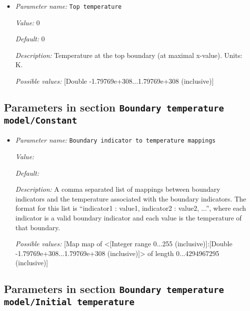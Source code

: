 \begin{itemize}
{\it Description:} Temperature at the right boundary (at maximal x-value). Units: K.


{\it Possible values:} [Double -1.79769e+308...1.79769e+308 (inclusive)]
\item {\it Parameter name:} {\tt Top temperature}


{\it Value:} 0


{\it Default:} 0


{\it Description:} Temperature at the top boundary (at maximal x-value). Units: K.


{\it Possible values:} [Double -1.79769e+308...1.79769e+308 (inclusive)]
\end{itemize}

\subsection{Parameters in section \tt Boundary temperature model/Constant}
\label{parameters:Boundary_20temperature_20model/Constant}

\begin{itemize}
\item {\it Parameter name:} {\tt Boundary indicator to temperature mappings}


{\it Value:} 


{\it Default:} 


{\it Description:} A comma separated list of mappings between boundary indicators and the temperature associated with the boundary indicators. The format for this list is ``indicator1 : value1, indicator2 : value2, ...'', where each indicator is a valid boundary indicator and each value is the temperature of that boundary.


{\it Possible values:} [Map map of <[Integer range 0...255 (inclusive)]:[Double -1.79769e+308...1.79769e+308 (inclusive)]> of length 0...4294967295 (inclusive)]
\end{itemize}

\subsection{Parameters in section \tt Boundary temperature model/Initial temperature}
\label{parameters:Boundary_20temperature_20model/Initial_20temperature}

